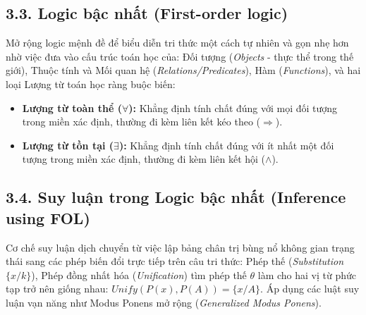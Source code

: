 \documentclass[../main.tex]{subfiles}
\begin{document}
\subsection{3.3. Logic bậc nhất (First-order logic)}
Mở rộng logic mệnh đề để biểu diễn tri thức một cách tự nhiên và gọn nhẹ hơn nhờ việc đưa vào cấu trúc toán học của: Đối tượng (\textit{Objects} - thực thể trong thế giới), Thuộc tính và Mối quan hệ (\textit{Relations/Predicates}), Hàm (\textit{Functions}), và hai loại Lượng từ toán học ràng buộc biến:
\begin{itemize}
    \item \textbf{Lượng từ toàn thể ($\forall$):} Khẳng định tính chất đúng với mọi đối tượng trong miền xác định, thường đi kèm liên kết kéo theo ($\Rightarrow$).
    \item \textbf{Lượng từ tồn tại ($\exists$):} Khẳng định tính chất đúng với ít nhất một đối tượng trong miền xác định, thường đi kèm liên kết hội ($\wedge$).
\end{itemize}

\subsection{3.4. Suy luận trong Logic bậc nhất (Inference using FOL)}
Cơ chế suy luận dịch chuyển từ việc lập bảng chân trị bùng nổ không gian trạng thái sang các phép biến đổi trực tiếp trên câu tri thức: Phép thế (\textit{Substitution} $\{x/k\}$), Phép đồng nhất hóa (\textit{Unification}) tìm phép thế $\theta$ làm cho hai vị từ phức tạp trở nên giống nhau: $Unify(P(x), P(A)) = \{x/A\}$. Áp dụng các luật suy luận vạn năng như Modus Ponens mở rộng (\textit{Generalized Modus Ponens}).
\end{document}
